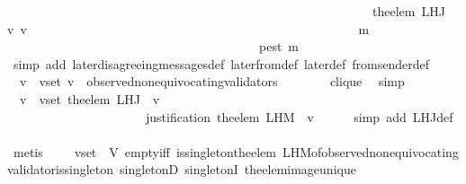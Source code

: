 \begin{isabellebody}
\ \ \ \ \ \ \ \ \ \ \ \ \ \ \ \ \ \ \ \ \ \ \ \ \ \ \ \ \ \ \ \ \ \ \ \ \ \ \ \ \ \ \ \ \ \ \ \ \ \ \ \ \ \ \ \ \ \ {\isacharparenleft}the{\isacharunderscore}elem\ {\isacharparenleft}L{\isacharunderscore}H{\isacharunderscore}J\ {\isasymsigma}\ v{\isacharparenright}{\isacharparenright}\ v{\isacharparenright}{\isacharparenright}\isanewline
\ \ \ \ \ \ \ \ \ \ \ \ \ \ \ \ \ \ \ \ \ \ \ \ \ \ \ \ \ \ \ \ \ \ \ \ \ \ \ \ \ \ \ \ \ \ \ \ \ \ \ \ m{\isacharprime}{\isacharbraceright}{\isachardot}\isanewline
\ \ \ \ \ \ \ \ \ \ \ \ \ \ \ \ \ \ \ \ \ \ \ \ \ \ \ \ \ \ \ \ \ \ \ \ \ \ \ \ p{\isacharparenleft}est\ m{\isacharparenright}{\isacharparenright}{\isachardoublequoteclose}\isanewline
\ \ \ \ \isamarkupfalse%
\ {\isacharparenleft}simp\ add{\isacharcolon}\ later{\isacharunderscore}disagreeing{\isacharunderscore}messages{\isacharunderscore}def\ later{\isacharunderscore}from{\isacharunderscore}def\ later{\isacharunderscore}def\ from{\isacharunderscore}sender{\isacharunderscore}def{\isacharparenright}\isanewline
\ \ \isamarkupfalse%
\ {\isachardoublequoteopen}{\isasymforall}\ v\ {\isasymin}\ v{\isacharunderscore}set{\isachardot}\ v\ {\isasymin}\ observed{\isacharunderscore}non{\isacharunderscore}equivocating{\isacharunderscore}validators\ {\isasymsigma}{\isachardoublequoteclose}\ \isanewline
\ \ \ \ \isamarkupfalse%
\ clique\ \isamarkupfalse%
\ simp\isanewline
\ \ \isamarkupfalse%
\ \isamarkupfalse%
\ {\isachardoublequoteopen}{\isasymforall}\ v\ {\isasymin}\ v{\isacharunderscore}set{\isachardot}\ the{\isacharunderscore}elem\ {\isacharparenleft}L{\isacharunderscore}H{\isacharunderscore}J\ {\isasymsigma}\ v{\isacharparenright}\isanewline
\ \ \ \ \ \ \ \ \ \ \ \ \ \ \ \ \ \ \ \ {\isacharequal}\ \ justification\ {\isacharparenleft}the{\isacharunderscore}elem\ {\isacharparenleft}L{\isacharunderscore}H{\isacharunderscore}M\ {\isasymsigma}\ v{\isacharparenright}{\isacharparenright}{\isachardoublequoteclose}\isanewline
\ \ \ \ \isamarkupfalse%
\ {\isacharparenleft}simp\ add{\isacharcolon}\ L{\isacharunderscore}H{\isacharunderscore}J{\isacharunderscore}def{\isacharparenright}\isanewline
\ \ \ \ \isamarkupfalse%
\ {\isacharparenleft}metis\ {\isacartoucheopen}{\isasymsigma}\ {\isasymin}\ {\isasymSigma}\ {\isasymand}\ v{\isacharunderscore}set\ {\isasymsubseteq}\ V{\isacartoucheclose}\ empty{\isacharunderscore}iff\ is{\isacharunderscore}singleton{\isacharunderscore}the{\isacharunderscore}elem\ L{\isacharunderscore}H{\isacharunderscore}M{\isacharunderscore}of{\isacharunderscore}observed{\isacharunderscore}non{\isacharunderscore}equivocating{\isacharunderscore}validator{\isacharunderscore}is{\isacharunderscore}singleton\ singletonD\ singletonI\ the{\isacharunderscore}elem{\isacharunderscore}image{\isacharunderscore}unique{\isacharparenright}\isanewline

\end{isabellebody}
